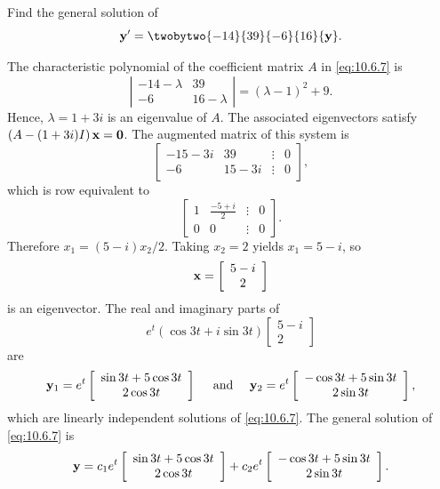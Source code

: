 \setcounter{example}{1}
\setcounter{equation}{6}
\begin{example}
  \label{example:10.6.2} \rm Find the general solution of
  \begin{equation}
    \label{eq:10.6.7}{\bf y}'=\twobytwo{-14}{39}{-6}{16}{\bf y}.
  \end{equation}
\end{example}
\begin{examplesolution}
\solution The characteristic polynomial of the coefficient matrix $A$ in \eqref{eq:10.6.7} is
\[
  \left|
  \begin{array}{cc}
    -14-\lambda & 39         \\
    -6          & 16-\lambda
  \end{array}\right|=(\lambda-1)^{2}+9.
\]
Hence, $\lambda=1+3i$ is an eigenvalue of $A$. The associated eigenvectors satisfy
$\left(A-(1+3i)I\right){\bf x}={\bf0}$. The augmented matrix of this system is
\[
  \left[
  \begin{array}{cccr}
    -15-3i & 39    & \vdots & 0 \\
    -6     & 15-3i & \vdots & 0
  \end{array}\right],
\]
which is row equivalent to
\[
  \left[
  \begin{array}{cccr}
    1 & \frac{-5+i}{2} & \vdots & 0 \\
    0 & 0              & \vdots & 0
  \end{array}\right].
\]
Therefore $x_{1}=(5-i)x_{2}/2$. Taking $x_{2}=2$ yields $x_{1}=5-i$, so
\[
  {\bf x}=\left[
  \begin{array}{c}
    5-i \\
    2
  \end{array}\right]
\]
is an eigenvector. The real and imaginary parts of
\[
  e^{t}(\cos3t+i\sin3t)\left[
  \begin{array}{c}
    5-i \\
    2
  \end{array}\right]
\]
are
\[
  {\bf y}_{1}=e^{t}\left[
  \begin{array}{c}
    \sin3t+5\cos3t \\
    2\cos 3t
  \end{array}\right]\quad\mbox{ and }\quad{\bf y}_{2}=e^{t}\left[
  \begin{array}{c}
    -\cos3t+5\sin3t \\
    2\sin 3t
  \end{array}\right],
\]
which are linearly independent solutions of \eqref{eq:10.6.7}. The general solution of
\eqref{eq:10.6.7} is
\[
  {\bf y}=c_{1}e^{t}\left[
  \begin{array}{c}
    \sin3t+5\cos3t \\
    2\cos 3t
  \end{array}\right]+ c_{2}e^{t}\left[
  \begin{array}{c}
    -\cos3t+5\sin3t \\
    2\sin 3t
  \end{array}\right].
\]
\end{examplesolution}

